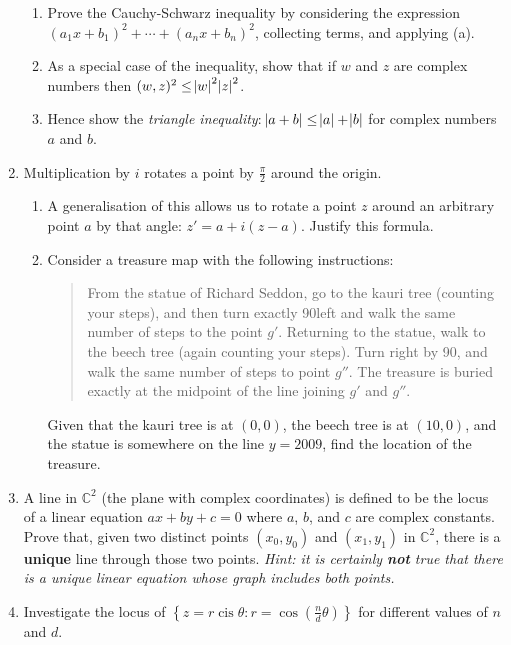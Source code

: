 \documentclass[a4paper,10pt,titlepage]{article}
\theoremstyle{definition}
\DeclareMathOperator{\cis}{cis}
\newcommand{\hard}{\refstepcounter{enumi}\item[$^\star$\theenumi.]}
\begin{document}
\begin{enumerate}
\begin{enumerate}
          \item Prove the Cauchy-Schwarz inequality by considering the expression $ (a_1 x + b_1)^2 + \cdots + (a_n x + b_n)^2 $,
                collecting terms, and applying (a).
          \item As a special case of the inequality, show that if $ w $ and $ z $ are complex numbers then $ (w, z)^2 \leq \abs{w}^2 \abs{z}^2 $.
          \item Hence show the \emph{triangle inequality}: $ \abs{a + b} \leq \abs{a} + \abs{b} $ for complex numbers $ a $ and $ b $.
        \end{enumerate}
  \item Multiplication by $ i $ rotates a point by $ \frac{\pi}{2} $ around the origin.
        \begin{enumerate}
          \item A generalisation of this allows us to rotate a point $ z $ around an arbitrary point $ a $ by that
                angle: $ z' = a + i(z-a) $. Justify this formula.
          \item Consider a treasure map with the following instructions:

                \begin{quote}
                  From the statue of Richard Seddon, go to the kauri tree (counting your steps), and then turn
                  exactly 90\degree left and walk the same number of steps to the point $ g' $. Returning
                  to the statue, walk to the beech tree (again counting your steps). Turn right by 90\degree,
                  and walk the same number of steps to point $ g'' $. The treasure is buried exactly at the midpoint
                  of the line joining $ g' $ and $ g'' $.
                \end{quote}

                Given that the kauri tree is at $ (0,0) $, the beech tree is at $ (10,0) $, and
                the statue is somewhere on the line $ y = 2009 $, find the location of the treasure.
          \end{enumerate}
  \hard A line in $ \mathbb{C}^2 $ (the plane with complex coordinates) is defined to be the locus of a linear equation
        $ ax + by + c = 0 $ where $ a $, $ b $, and $ c $ are complex constants. Prove that, given two distinct points $ (x_0, y_0) $
        and $ (x_1, y_1) $ in $ \mathbb{C}^2 $, there is a \textbf{unique} line through those two points. \textit{Hint: it is certainly \textbf{not} true
        that there is a unique linear equation whose graph includes both points.}
  \hard Investigate the locus of $ \left\{z = r\cis\theta : r = \cos\left(\frac{n}{d}\theta\right)\right\} $ for different values of $ n $
        and $ d $.
\end{enumerate}
\end{document}
